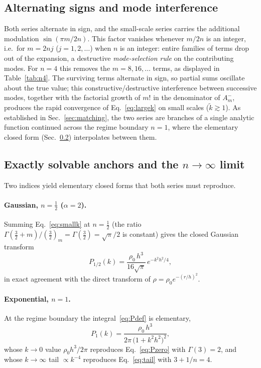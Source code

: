 \documentclass[aps,prd,onecolumn]{revtex4-2}
\newcommand{\kt}{\tilde{k}}          %
\begin{document}
\subsection{Alternating signs and mode interference}
\label{sec:interference}

Both series alternate in sign, and the small-scale series carries the
additional modulation $\sin(\pi m/2n)$.  This factor vanishes whenever
$m/2n$ is an integer, i.e.\ for $m=2nj$ ($j=1,2,\dots$) when $n$ is an
integer: entire families of terms drop out of the expansion, a destructive
\emph{mode-selection rule} on the contributing modes.  For $n=4$ this
removes the $m=8,16,\dots$ terms, as displayed in Table~\ref{tab:n4}.  The
surviving terms alternate in sign, so partial sums oscillate about the
true value; this constructive/destructive interference between successive
modes, together with the factorial growth of $m!$ in the denominator of
$A_m^{-}$, produces the rapid convergence of Eq.~\eqref{eq:largek} on small
scales ($\kt\gtrsim1$).  As established in Sec.~\ref{sec:matching}, the two
series are branches of a single analytic function continued across the
regime boundary $n=1$, where the elementary closed form
(Sec.~\ref{sec:anchors}) interpolates between them.

\subsection{Exactly solvable anchors and the $n\to\infty$ limit}
\label{sec:anchors}
\label{sec:ninf}

Two indices yield elementary closed forms that both series must reproduce.

\paragraph*{Gaussian, $n=\tfrac12$ ($\alpha=2$).}
Summing Eq.~\eqref{eq:smallk} at $n=\tfrac12$ (the ratio
$\Gamma(\tfrac32+m)/(\tfrac32)_m=\Gamma(\tfrac32)=\sqrt\pi/2$ is constant)
gives the closed Gaussian transform
\begin{equation}
P_{1/2}(k)=\frac{\rho_0\,h^3}{16\sqrt\pi}\,
            e^{-k^2h^2/4},
\label{eq:gaussian}
\end{equation}
in exact agreement with the direct transform of
$\rho=\rho_0 e^{-(r/h)^2}$.

\paragraph*{Exponential, $n=1$.}
At the regime boundary the integral~\eqref{eq:Pdef} is elementary,
\begin{equation}
P_{1}(k)=\frac{\rho_0\,h^3}{2\pi\,\bigl(1+k^2h^2\bigr)^2},
\label{eq:exponential}
\end{equation}
whose $k\to0$ value $\rho_0 h^3/2\pi$ reproduces Eq.~\eqref{eq:Pzero} with
$\Gamma(3)=2$, and whose $k\to\infty$ tail $\propto k^{-4}$ reproduces
Eq.~\eqref{eq:tail} with $3+1/n=4$.
\end{document}
